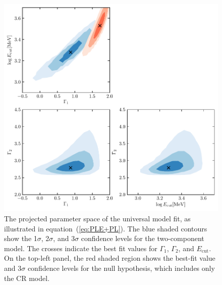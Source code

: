 \documentclass[doublespace,nopageskip]{VTthesis} %
\begin{document}
\begin{figure}
    \centering
    \includegraphics[width=\textwidth]{Figures/Globular/globalfit.pdf}
    \caption{The projected parameter space of the universal model fit, as illustrated in equation~(\ref{eq:PLE+PL}). The blue shaded contours show the 1$\sigma$, 2$\sigma$, and 3$\sigma$ confidence levels for the two-component model. The crosses indicate the best fit values for $\Gamma_1$, $\Gamma_2$, and $E_\mathrm{cut}$. On the top-left panel, the red shaded region shows the best-fit value and 3$\sigma$ confidence levels for the null hypothesis, which includes only the CR model.}
    \label{fig:global}
\end{figure}
\end{document}
